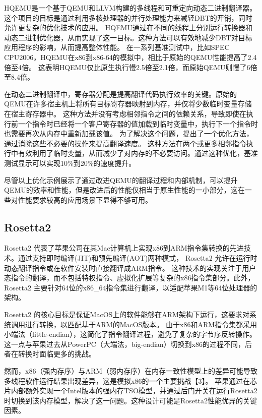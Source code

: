 HQEMU\cite{Hong2012HQEMUAM}是一个基于QEMU和LLVM构建的多线程和可重定向动态二进制翻译器。这个项目的目标是通过利用多核处理器的并行处理能力来减轻DBT的开销，同时允许更复杂的优化技术的应用。
HQEMU通过在不同的线程上分别运行转换器和动态二进制优化器，从而实现了这一目标。这种方法可以有效地减少DBT对目标应用程序的影响，从而提高整体性能。
在一系列基准测试中，比如SPEC CPU2006，HQEMU在x86到x86-64的模拟中，相比于原始的QEMU性能提高了2.4倍至4倍。
这表明HQEMU仅比原生执行慢2.5倍至2.1倍，而原始QEMU则慢了6倍至8.4倍。

在动态二进制翻译中，寄存器分配是提高翻译代码执行效率的关键。原始的QEMU在许多宿主机上将所有目标寄存器映射到内存，并仅将少数临时变量存储在宿主寄存器中。
这种方法并没有考虑相邻指令之间的依赖关系，导致即使在执行前一个指令时已经将一个客户寄存器的值加载到临时变量中，执行下一个指令时也需要再次从内存中重新加载该值。
为了解决这个问题，\cite{Hong2012HQEMUAM}提出了一个优化方法，通过消除这些不必要的操作来提高翻译速度。
这种方法在两个或更多相邻指令执行中有效利用了临时变量，从而减少了对内存的不必要访问。通过这种优化，基准测试显示可以实现10\%到20\%的速度提升。

尽管以上优化示例展示了通过改进QEMU的翻译过程和内部机制，可以提升QEMU的效率和性能，但是改进后的性能仅相当于原生性能的一小部分，这在一些对性能要求较高的应用场景下显得不够可用。



\subsection{Rosetta2}

Rosetta2 代表了苹果公司在其Mac计算机上实现x86到ARM指令集转换的先进技术。通过支持即时编译(JIT)和预先编译(AOT)两种模式，
Rosetta2 允许在运行时动态翻译指令或在软件安装时直接翻译成ARM指令。
这种技术的实现关注于用户态指令的翻译，而不包括特权指令、虚拟化扩展等复杂的x86指令集部分。此外，Rosetta2 主要针对64位的x86\_64指令集进行翻译，以适配苹果M1等64位处理器的架构。

Rosetta2 的核心目标是保证MacOS上的软件能够在ARM架构下运行，这要求对系统调用进行转换，以匹配基于ARM的MacOS版本。
由于x86和ARM指令集都采用小端法（little-endian），这简化了指令翻译过程，避免了复杂的字节序反转操作。
这一点与苹果过去从PowerPC（大端法，big-endian）切换到x86的过程不同，后者在转换时面临更多的挑战。

然而，x86（强内存序）与ARM（弱内存序）在内存一致性模型上的差异可能导致多线程软件运行结果出现差异，这是模拟x86的一个主要挑战【3】。
苹果通过在芯片内部额外实现一个Intel版本的强内存TSO模型，并通过后门开关在运行Rosetta2时切换到该内存模型，解决了这一问题。这种设计可能是Rosetta2性能优异的关键因素。

